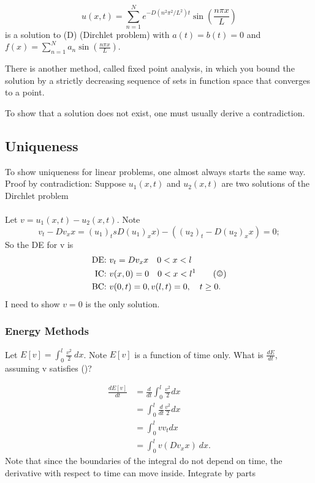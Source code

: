 \documentclass{article}
\begin{document}
$$u(x,t) = \sum_{n=1}^{N} e^{-D(n^2 \pi^2 / L^2)t}\sin(\frac{n \pi x}{L})$$
is a solution to (D) (Dirchlet problem) with 
$a(t) = b(t) = 0$ and $f(x) = \sum_{n=1}^{N} a_n \sin(\frac{n \pi x}{L}).$

There is another method, called fixed point analysis, in which you bound the solution by a strictly decreasing sequence of sets in function space that converges to a point.

To show that a solution does not exist, one must usually derive a contradiction.

\subsection{Uniqueness}
To show uniqueness for linear problems, one almost always starts the same way. Proof by contradiction:
Suppose $u_1(x,t)$ and $u_2(x,t)$ are two solutions of the Dirchlet problem
\\~\\
Let $v = u_1(x,t) - u_2(x,t)$. Note
$$v_t - Dv_xx = (u_1)_t s D(u_1)_xx) - ((u_2)_t - D(u_2)_xx) = 0;$$
So the DE for v is
\begin{align*}
\text{DE:}&~ v_t = Dv_xx \quad 0 < x < l\\
\text{IC:}&~ v(x,0) = 0 \quad 0 < x < l \text{\footnotemark} \tag{\smiley} \\
\text{BC:}&~ v(0,t) = 0, v(l,t) = 0, \quad t \geq 0.
\end{align*}
I need to show $v= 0$ is the only solution.

\subsubsection{Energy Methods}

Let $E[v] = \int_0^l \frac{v^2}{2} ~dx$. Note $E[v]$ is a function of time only.
What is $\frac{dE}{dt}$, assuming v satisfies (\smiley)?

\begin{align*}
\frac{dE[v]}{dt} &= \frac{d}{dt} \int_0^l \frac{v^2}{2} dx\\
&=  \int_0^l \frac{d}{dt} \frac{v^2}{2} dx\\
&= \int_0^l v v_t dx\\
&= \int_0^l v(Dv_xx)~dx.
\end{align*}
Note that since the boundaries of the integral do not depend on time, the derivative with respect to time can move inside. Integrate by parts
\end{document}
